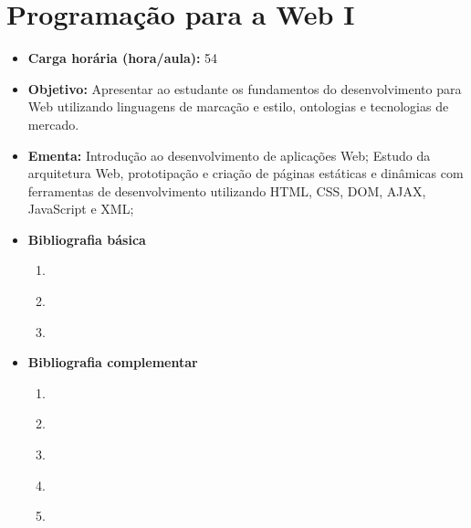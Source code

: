 \documentclass[
	10pt,				%
	openright,			%
	twoside,			%
	a4paper,			%
	english,			%
	french,				%
	brazil,				%
	sumario=tradicional
]{abntex2}
\begin{document}


\newpage
\section*{Programação para a Web I}\label{4_ppw1}
\begin{itemize}
	\item \textbf{Carga horária (hora/aula):} 54
	\item \textbf{Objetivo:} Apresentar ao estudante os fundamentos do desenvolvimento para Web utilizando linguagens de marcação e estilo, ontologias e tecnologias de mercado.
	\item \textbf{Ementa:} 
	Introdução ao desenvolvimento de aplicações Web;
	Estudo da arquitetura Web, prototipação e criação de páginas estáticas e dinâmicas com ferramentas de desenvolvimento utilizando HTML, CSS, DOM, AJAX, JavaScript e XML;
	\item \textbf{Bibliografia básica}
	\begin{enumerate}
		\item \cite{rodrigues2010}
		\item \cite{ducket2010}
		\item \cite{goncalves2007}
	\end{enumerate}
	\item \textbf{Bibliografia complementar}
	\begin{enumerate}
		\item \cite{silva2008}
		\item \cite{silva2014}
		\item \cite{silva2014a}
		\item \cite{marcondes2009}
		\item \cite{cartilha2012}
	\end{enumerate}
\end{itemize}


\newpage
\end{document}
